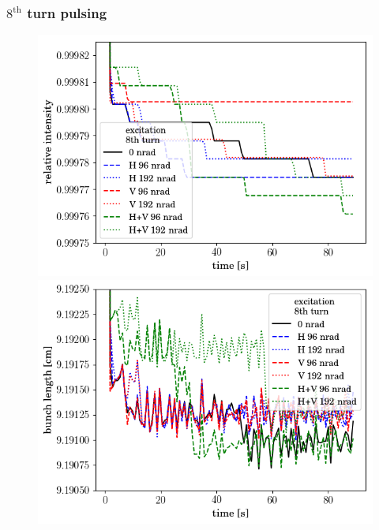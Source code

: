 \documentclass[%
 reprint,
 amsmath,amssymb,
 aps,
prstab,
]{revtex4-1}
\begin{document}
\subsubsection{$8^{\mathrm{th}}$ turn pulsing\label{sec:simex8}}
\begin{figure}[b]
	\begin{minipage}[t]{0.49\linewidth}
		\centering
		\includegraphics[width=1.0\linewidth]{2017injerra2b2uran1_2e-3_8th_3_5um_intensity.png}
	\end{minipage}
	\begin{minipage}[t]{0.49\linewidth}
		\centering
		\includegraphics[width=1.0\linewidth]{2017injerra2b2uran1_2e-3_8th_3_5um_sigm.png}
	\end{minipage}
	\begin{minipage}[t]{0.49\linewidth}

\end{minipage}
\end{figure}
\end{document}
